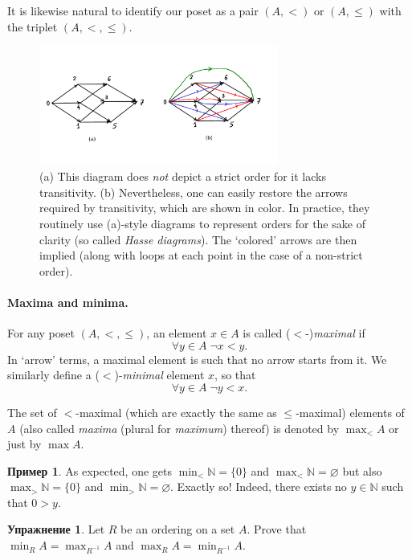 \documentclass[12pt,notitlepage]{article}
\theoremstyle{plain}
\theoremstyle{definition}
\newtheorem{exc}[thm]{Упражнение}
\newtheorem{exm}[thm]{Пример}
\theoremstyle{plain}
\newcommand{\N}{\mathbb{N}}
\newcommand{\void}{\varnothing}
\newcommand{\1}{\mathbf{1}}
\newcommand{\0}{\mathbf{0}}
\begin{document}
It is likewise natural to identify our poset as a pair $(A, <)$ or $(A, \leq)$ with the triplet $(A, <, \leq)$.

\begin{figure}[h]
	\centering
	\includegraphics*[width=0.7\textwidth]{hasse.pdf}
	\caption{\label{fig:cube_3}(a) This diagram does \emph{not} depict a strict order for it lacks transitivity. (b) Nevertheless, one can easily restore the arrows required by transitivity, which are shown in color. In practice, they routinely use (a)-style diagrams to represent orders for the sake of clarity (so called \emph{Hasse diagrams}). The `colored' arrows are then implied (along with loops at each point in the case of a non-strict order).}
\end{figure}

\paragraph{Maxima and minima.} For any poset $(A, {<}, {\leq})$, an element $x \in A$ is called ($<$-)\emph{maximal} if
$$\forall y \in A\; \neg x < y.$$
In `arrow' terms, a maximal element is such that no arrow starts from it. We similarly define a (${<}$)-\emph{minimal} element $x$, so that
$$\forall y \in A\; \neg y < x.$$

The set of  ${<}$-maximal (which are exactly the same as ${\leq}$-maximal) elements of $A$ (also called \emph{maxima} (plural for \emph{maximum}) thereof) is denoted by $\max_{<} A$ or just by $\max A$.

\begin{exm}
	As expected, one gets $\min_{<} \N = \{0\}$ and $\max_{<} \N = \void$ but also $\max_{>} \N = \{0\}$ and $\min_{>} \N = \void$. Exactly so! Indeed, there exists no $y \in \N$ such that $0 > y$.
\end{exm}

\begin{exc}
	Let $R$ be an ordering on a set $A$. Prove that $\min_{R} A = \max_{R^{-1}} A$ and $\max_{R} A = \min_{R^{-1}} A$.
\end{exc}
\end{document}

